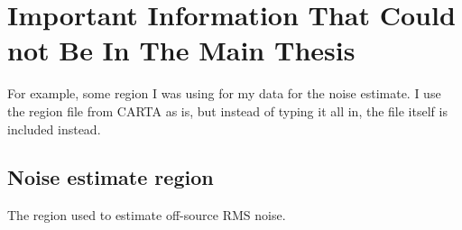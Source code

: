 \chapter{Important Information That Could not Be In The Main Thesis}
\label{app:A} %


For example, some region I was using for my data for the noise estimate. I use the region file from CARTA as is, but instead of typing it all in, the file itself is included instead.

\section{Noise estimate region}
\label{app:noise-estimate}
The region used to estimate off-source RMS noise.
\inputminted{text}{snippets/some-noise.reg}

